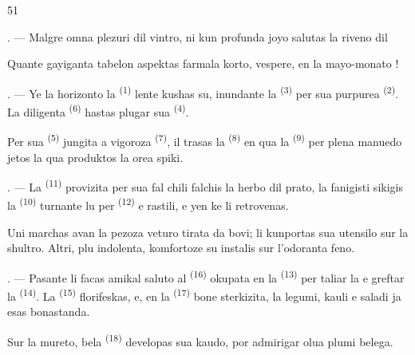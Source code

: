 \begin{VUpage}[53]{51}
\VUsaut{3.0mm}
\VUsaut{3.0mm}

\VUsaut{4.0mm}

. --- Malgre omna plezuri dil vintro, ni kun\nl
profunda joyo salutas la riveno dil 

\VUblancAlinea
Quante gayiganta tabelon aspektas farmala\nl
korto, vespere, en la mayo-monato !

. --- Ye la horizonto la  \textsuperscript{(1)} lente kushas\nl
su, inundante la  \textsuperscript{(3)} per sua purpurea \cc
{} \textsuperscript{(2)}. La diligenta  \textsuperscript{(6)} hastas plugar\nl
sua  \textsuperscript{(4)}.

\VUblancAlinea
Per sua  \textsuperscript{(5)} jungita a vigoroza \cc
{} \textsuperscript{(7)}, il trasas la  \textsuperscript{(8)} en qua la \cc
{} \textsuperscript{(9)} per plena manuedo jetos la \nl
qua produktos la orea spiki.

. --- La  \textsuperscript{(11)} provizita per sua fal\cc
chili falchis la herbo dil prato, la fanigisti\nl
sikigis la  \textsuperscript{(10)} turnante lu per  \textsuperscript{(12)} e\nl
rastili, e yen ke li retrovenas.

\VUblancAlinea
Uni marchas avan la pezoza veturo tirata da\nl
bovi; li kunportas sua utensilo sur la shultro.\nl
Altri, plu indolenta, komfortoze su instalis sur\nl
l'odoranta feno.

. --- Pasante li facas amikal saluto al \cc
{} \textsuperscript{(16)} okupata en la  \textsuperscript{(13)}\nl
per taliar la  e greftar la  \textsuperscript{(14)}.\nl
La  \textsuperscript{(15)} florifeskas, e, en la \cc
{} \textsuperscript{(17)} bone sterkizita, la legumi, kauli e\nl
saladi ja esas bonastanda.

\VUblancAlinea
Sur la mureto, bela  \textsuperscript{(18)} developas\nl
sua kaudo, por admirigar olua plumi belega.
\end{VUpage}

